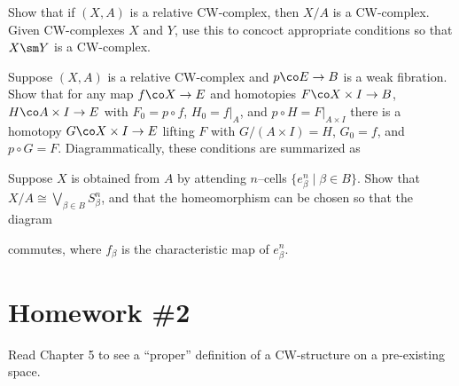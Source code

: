 \begin{problem}
Show that if $(X, A)$ is a relative CW-complex, then $X/A$ is a CW-complex.  Given CW-complexes $X$ and $Y$, use this to concoct appropriate conditions so that $X \sm Y$ is a CW-complex.
\end{problem}

\begin{problem}
Suppose $(X, A)$ is a relative CW-complex and $p\co E \to B$ is a weak fibration.  Show that for any map $f\co X \to E$ and homotopies $F\co X \times I \to B$, $H\co A \times I \to E$ with $F_0 = p \circ f$, $H_0 = f|_A$, and $p \circ H = F|_{A \times I}$ there is a homotopy $G\co X \times I \to E$ lifting $F$ with $G/(A \times I) = H$, $G_0 = f$, and $p \circ G = F$.  Diagrammatically, these conditions are summarized as
\begin{center}
\end{center}
\end{problem}

\begin{problem}
Suppose $X$ is obtained from $A$ by attending $n$--cells $\{e_\beta^n \mid \beta \in B\}$.  Show that $X / A \cong \bigvee_{\beta \in B} S^n_\beta$, and that the homeomorphism can be chosen so that the diagram
\begin{center}
\end{center}
commutes, where $f_\beta$ is the characteristic map of $e^n_\beta$.
\end{problem}




\section{Homework \#2}

\begin{task}
Read Chapter 5 to see a ``proper'' definition of a CW-structure on a pre-existing space.
\end{task}

